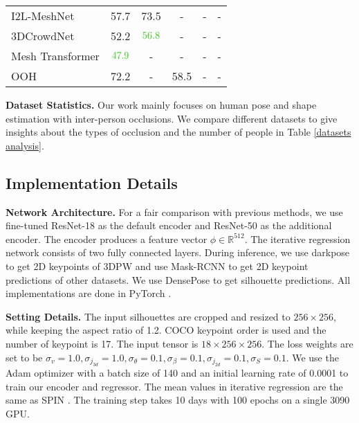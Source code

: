 \documentclass[journal]{IEEEtran}
\begin{document}
\begin{table*}[htbp]
\begin{center}
\begin{tabular}{lccccc}
I2L-MeshNet \cite{Moon_2020_ECCV_I2L-MeshNet} & 57.7 & 73.5               & - & -               & -                 \\
3DCrowdNet \cite{choi20213dcrowdnet}  & 52.2 &  ${\color[HTML]{32CB16} 56.8}$             &- & -                & -               \\
Mesh Transformer \cite{lin2021end-to-end}  &${\color[HTML]{32CB16} 47.9}$ & -               & - & -                & -              \\
OOH\cite{zhang2020object}                          & 72.2                  & -                                   & 58.5               & -                                 & -                                  \\
\bottomrule
\end{tabular}

\label{table:total}
\end{center}
\end{table*}

\noindent\textbf{Dataset Statistics.} Our work mainly focuses on human pose and shape estimation with inter-person occlusions. We compare different datasets to give insights about the types of occlusion and the number of people in Table \ref{datasets analysis}.

\subsection{Implementation Details}
\noindent\textbf{Network Architecture.} For a fair comparison with previous methods, we use fine-tuned  ResNet-18 \cite{he2016deep} as the default encoder and ResNet-50 as the additional encoder. The encoder produces a feature vector $\phi \in \mathbb{R}^{512}$. The iterative regression network consists of two fully connected layers. During inference, we use darkpose \cite{Zhang_2020_CVPR} to get 2D keypoints of 3DPW and use Mask-RCNN \cite{he2017mask} to get 2D keypoint predictions of other datasets. We use DensePose \cite{guler2018densepose} to get silhouette predictions. All implementations are done in PyTorch \cite{paszke2019pytorch}. 

\noindent\textbf{Setting Details.} The input silhouettes are cropped and resized to $256\times256$, while keeping the aspect ratio of 1.2. COCO keypoint order is used and the number of keypoint is 17. The input tensor is $18\times256\times256$. The loss weights are set to be  $\sigma_{v}=1.0, \sigma_{j_{3d}}=1.0, \sigma_{\theta}=0.1, \sigma_{\beta}=0.1, \sigma_{j_{2d}}=0.1, \sigma_{S}=0.1$. We use the Adam optimizer \cite{kingma2014adam} with a batch size of 140 and an initial learning rate of 0.0001 to train our encoder and regressor. The mean values in iterative regression are the same as SPIN \cite{kolotouros2019spin}. The training step takes 10 days with 100 epochs on a single 3090 GPU.
\end{document}
